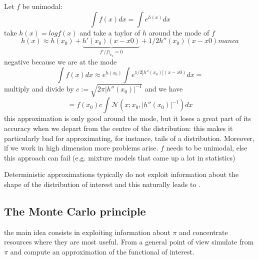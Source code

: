 \documentclass{article}
\begin{document}
    \begin{example}
       Let $f$ be unimodal:
    \begin{equation*}
        \int f (x) dx = \int e^{h(x)} dx 
    \end{equation*}
    take $h(x)= log f(x)$ and take a taylor of $h$ around the mode of $f$
    \begin{equation*}
        h(x)  \approx h (x_0) + \underbrace{h'(x_0)(x-x0)}_{f'/f|_{x_0}=0}+ 1/2h''(x_0)(x-x0) manca 
    \end{equation*}
    negative because we are at the mode
    \begin{equation*}
        \int f(x) dx \approx e ^{h(x_0)} \int  e ^{1/2 |h''(x_0)|(x-x0)} dx=
    \end{equation*}
    multiply and divide by $c:=\sqrt{2 \pi |h''(x_0)|^{-1}}$ and we have 
    \begin{equation*}
        =f(x_0) c \int \mathcal{N}(x; x_0, |h''(x_0)|^{-1})dx
    \end{equation*}
    this approximation is only good around the mode, but it loses a great part of its accuracy when we depart from the centre of the distribution: this makes it particularly bad for approximating, for instance, tails of a distribution. Moreover, if we work in high dimension more problems arise. $f$ needs to be unimodal, else this approach can fail (e.g. mixture models that came up a lot in statistics)     
    \end{example}

Deterministic approximations typically do not exploit information about the shape of the distribution of interest and this naturally leads to . 
\subsection{The Monte Carlo principle}
the main idea consists in exploiting information about $\pi$ and concentrate resources where they are most useful. From a general point of view simulate from $\pi$ and compute an approximation of the functional of interest. 
\end{document}
